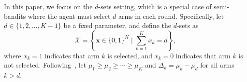



In this paper, we focus on the $d$-sets setting, which is a special case of semi-bandits where the agent must select $d$ arms in each round. Specifically, let $d \in \{1, 2, \ldots, K - 1\}$ be a fixed parameter, and define the $d$-sets as
\[
\mathcal{X} = \left\{ \mathbf{x} \in \{0, 1\}^K \mid \sum_{k=1}^K x_k = d \right\},
\]
where $x_k = 1$ indicates that arm $k$ is selected, and $x_k = 0$ indicates that arm $k$ is not selected.
Following~\citep{zimmert2019beating,dann2023blackbox}, let $\mu_1 \geq \mu_2 \geq \cdots \geq \mu_K$ and $\Delta_k = \mu_k - \mu_d$ for all arms $k > d$.

